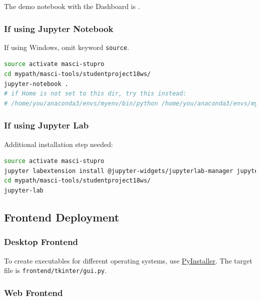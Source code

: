 The demo notebook with the Dashboard is
.

\subsubsection{If using Jupyter
  Notebook}\label{if-using-jupyter-notebook}

If using Windows, omit keyword \texttt{source}.

\begin{lstlisting}[language=bash, style=code]
source activate masci-stupro
cd mypath/masci-tools/studentproject18ws/
jupyter-notebook .
# if Home is not set to this dir, try this instead:
# /home/you/anaconda3/envs/myenv/bin/python /home/you/anaconda3/envs/myenv/bin/jupyter-notebook .
\end{lstlisting}

\subsubsection{If using Jupyter Lab}\label{if-using-jupyter-lab}

Additional installation step needed:

\begin{lstlisting}[language=bash, style=code]
source activate masci-stupro
jupyter labextension install @jupyter-widgets/jupyterlab-manager jupyter-matplotlib ipyvolume
cd mypath/masci-tools/studentproject18ws/
jupyter-lab
\end{lstlisting}

\subsection{Frontend Deployment}\label{frontend-deployment}

\subsubsection{Desktop Frontend}\label{desktop-frontend-1}

To create executables for different operating systems, use
\href{https://www.pyinstaller.org/}{PyInstaller}. The target file is
\texttt{frontend/tkinter/gui.py}.

\subsubsection{Web Frontend}\label{web-frontend-1}

